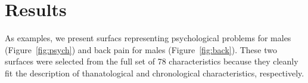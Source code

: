 \documentclass{article}
\begin{document}






\section*{Results}

As examples, we present surfacs representing psychological problems for males
(Figure~\ref{fig:psych}) and back pain for males (Figure~\ref{fig:back}).
These two surfaces were selected from the full set of 78 characteristics because they cleanly fit the
description of thanatological and chronological characteristics, respectively. 
\end{document}
